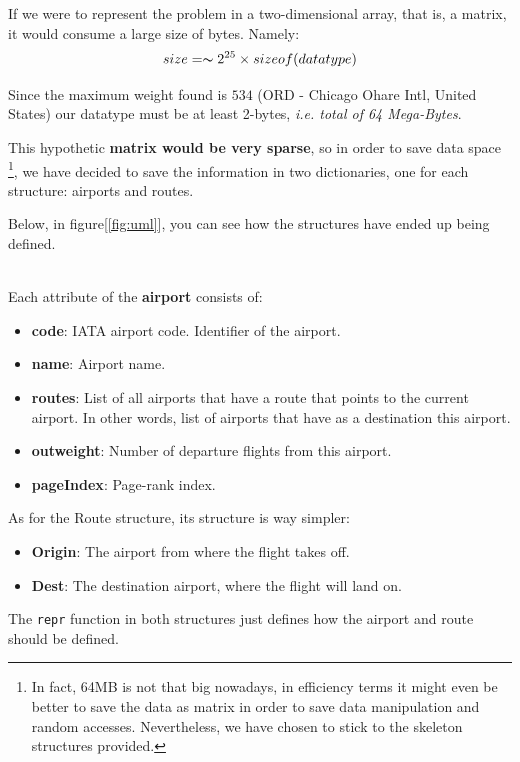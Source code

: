 \documentclass[10pt, a4paper]{article}
\begin{document}
If we were to represent the problem in a two-dimensional array, that is, a matrix, it would consume a large size of bytes. Namely:  $$size = \thicksim 2^{25}\times sizeof(datatype)$$

Since the maximum weight found is $534$ (ORD - Chicago Ohare Intl, United States) our datatype must be at least 2-bytes, \textit{i.e. total of 64 Mega-Bytes}. 

This hypothetic \textbf{matrix would be very sparse}, so in order to save data space \footnote{In fact, 64MB is not that big nowadays, in efficiency terms it might even be better to save the data as matrix in order to save data manipulation and random accesses. Nevertheless, we have chosen to stick to the skeleton structures provided.}, we have decided to save the information in two dictionaries, one for each structure: airports and routes.

\noindent Below, in figure[\ref{fig:uml}], you can see how the structures have ended up being defined. 

\\\noindent Each attribute of the \textbf{airport} consists of:
\begin{itemize}
    \item \textbf{code}: IATA airport code. Identifier of the airport.
    \item \textbf{name}: Airport name.
    \item \textbf{routes}: List of all airports that have a route that points to the current airport. In other words, list of airports that have as a destination this airport.
    \item \textbf{outweight}: Number of departure flights from this airport.
    \item \textbf{pageIndex}: Page-rank index.
\end{itemize}
\noindent As for the Route structure, its structure is way simpler:
\begin{itemize}
    \item \textbf{Origin}: The airport from where the flight takes off.
    \item \textbf{Dest}: The destination airport, where the flight will land on.
\end{itemize}
The \texttt{repr} function in both structures just defines how the airport and route should be defined.
\end{document}
